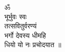\documentclass{article}
\begin{document}
\begin{center}
  {
  \foreignlanguage{sanskrit}{ॐ \\
भूर्भुवः स्वः\\ 
तत्सवितुर्वरण्यं\\
भर्गो देवस्य धीमहि\\
धियो यो नः प्रचोदयात ॥}
}
\end{center}
\end{document}
